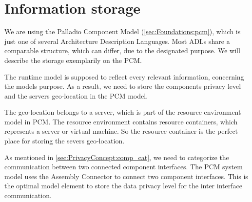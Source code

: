 \section{Information storage}
\label{sec:PrivacyConcept:pcm}

We are using the Palladio Component Model (\autoref{sec:Foundations:pcm}), which is just one of several Architecture Description Languages. Most ADLs share a comparable structure, which can differ, due to the designated purpose. We will describe the storage exemplarily on the PCM.

The runtime model is supposed to reflect every relevant information, concerning the models purpose. As a result, we need to store the components privacy level and the servers geo-location in the PCM model.

The geo-location belongs to a server, which is part of the resource environment model in PCM. The resource environment contains resource containers, which represents a server or virtual machine. So the resource container is the perfect place for storing the severs geo-location.

As mentioned in \autoref{sec:PrivacyConcept:comp_cat}, we need to categorize the communication between two connected component interfaces. The PCM system model uses the Assembly Connector to connect two component interfaces. This is the optimal model element to store the data privacy level for the inter interface communication.






